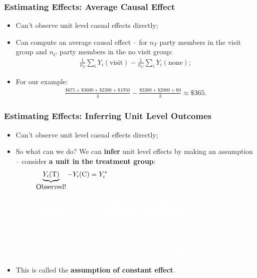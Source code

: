 \documentclass[aspectratio=169]{beamer}
\theoremstyle{principle}
\begin{document}
\begin{frame}
\frametitle{Estimating Effects: Average Causal Effect}
\begin{itemize}
\item Can't observe unit level casual effects directly;
\bigskip
\bigskip
\item Can compute an average causal effect -- for $n_T$ party members in the visit group and $n_C$ party members in the no visit group:
\begin{align*}
\frac{1}{n_T}\sum_iY_i(\mbox{visit}) - \frac{1}{n_C}\sum_iY_i(\mbox{none});
\end{align*}
\bigskip
\item For our example:
\begin{align*}
\frac{\$675 + \$3600 + \$2300 + \$1950}{4} - \frac{\$3300 + \$2000 + \$0}{3} \approx \$365.
\end{align*}
\end{itemize}
\end{frame}

\begin{frame}
\frametitle{Estimating Effects: Inferring Unit Level Outcomes}
\begin{itemize}
\item Can't observe unit level casual effects directly;
\bigskip
\item So what can we do?  We can \textbf{infer} unit level effects by making an assumption -- consider \textbf{a unit in the treatment group}:
\begin{align*}
\underbrace{Y_i(\mbox{T})}_{\mbox{Observed!}} - Y_i(\mbox{C}) &= Y_i^*\\
\color{white}\underbrace{Y_i(\mbox{T})}_{\mbox{Observed!}} - Y_i(\mbox{C}) &\color{white}= \underbrace{\frac{1}{n_T}\sum_iY_i(\mbox{T}) - \frac{1}{n_C}\sum_iY_i(\mbox{C})}_{\mbox{Observed!}}\\
\color{white}Y_i(\mbox{C}) &\color{white}= \underbrace{Y_i(\mbox{T})}_{\mbox{Observed!}} - \underbrace{\left(\frac{1}{n_T}\sum_iY_i(\mbox{T}) - \frac{1}{n_C}\sum_iY_i(\mbox{C})\right)}_{\mbox{Observed!}}
\end{align*}
\item[] \color{white} This is called the \textbf{assumption of constant effect}.
\end{itemize}
\end{frame}
\end{document}
